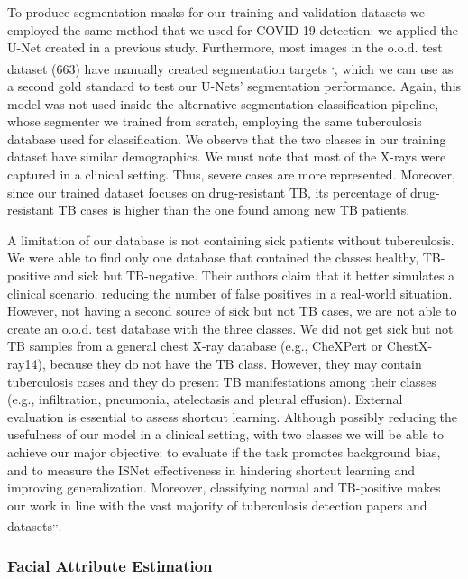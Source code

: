 \documentclass[fleqn,10pt]{wlscirep}
\begin{document}
{To produce segmentation masks for our training and validation datasets we employed the same method that we used for COVID-19 detection: we applied the U-Net created in a previous study\cite{bassi2021covid19}. Furthermore, most images in the o.o.d. test dataset (663) have manually created segmentation targets \cite{ShenMasks}\textsuperscript{,}\cite{ChineseDataset1}, which we can use as a second gold standard to test our U-Nets' segmentation performance. Again, this model was not used inside the alternative segmentation-classification pipeline, whose segmenter we trained from scratch, employing the same tuberculosis database used for classification. We observe that the two classes in our training dataset have similar demographics. We must note that most of the X-rays were captured in a clinical setting. Thus, severe cases are more represented. Moreover, since our trained dataset focuses on drug-resistant TB, its percentage of drug-resistant TB cases is higher than the one found among new TB patients\cite{TBData}.

A limitation of our database is not containing sick patients without tuberculosis. We were able to find only one database that contained the classes healthy, TB-positive and sick but TB-negative. Their authors claim that it better simulates a clinical scenario, reducing the number of false positives in a real-world situation\cite{TBX11K}. However, not having a second source of sick but not TB cases, we are not able to create an o.o.d. test database with the three classes. We did not get sick but not TB samples from a general chest X-ray database (e.g., CheXPert\cite{irvin2019chexpert} or ChestX-ray14\cite{chex14}), because they do not have the TB class. However, they may contain tuberculosis cases and they do present TB manifestations among their classes (e.g., infiltration, pneumonia, atelectasis and pleural effusion\cite{TBSigns}). External evaluation is essential to assess shortcut learning. Although possibly reducing the usefulness of our model in a clinical setting, with two classes we will be able to achieve our major objective: to evaluate if the task promotes background bias, and to measure the ISNet effectiveness in hindering shortcut learning and improving generalization. Moreover, classifying normal and TB-positive makes our work in line with the vast majority of tuberculosis detection papers and datasets\cite{TBNat}\textsuperscript{,}\cite{TBReview}\textsuperscript{,}\cite{TBRev2}.

\subsubsection{Facial Attribute Estimation}

}
\end{document}
